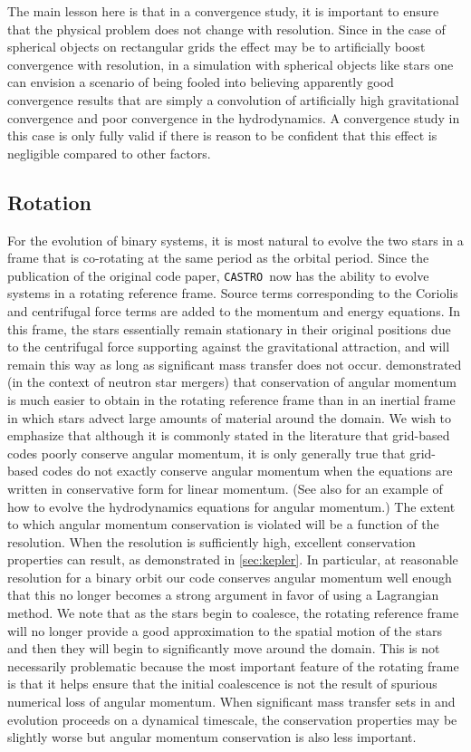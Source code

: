 \documentclass[iop]{../emulateapj}
\newcommand{\castro}{\texttt{CASTRO}}
\begin{document}
The main lesson here is that in a convergence study, it is important
to ensure that the physical problem does not change with
resolution. Since in the case of spherical objects on rectangular
grids the effect may be to artificially boost convergence with resolution,
in a simulation with spherical objects like stars one can envision a
scenario of being fooled into believing apparently good convergence
results that are simply a convolution of artificially high
gravitational convergence and poor convergence in the hydrodynamics. A
convergence study in this case is only fully valid if there is reason
to be confident that this effect is negligible compared to other
factors.

\subsection{Rotation}\label{sec:rotation}

For the evolution of binary systems, it is most natural to evolve the
two stars in a frame that is co-rotating at the same period as the
orbital period. Since the publication of the original code paper, \castro\ 
now has the ability to evolve systems in a rotating reference frame. 
Source terms corresponding to the Coriolis and centrifugal 
force terms are added to the momentum and energy equations. In this frame, 
the stars essentially remain stationary in their original positions due to the
centrifugal force supporting against the gravitational attraction, and
will remain this way as long as significant mass transfer does not
occur. \cite{swc:2000} demonstrated (in the context of neutron star
mergers) that conservation of angular momentum is much easier to
obtain in the rotating reference frame than in an inertial frame in
which stars advect large amounts of material around the domain. We
wish to emphasize that although it is commonly stated in the
literature that grid-based codes poorly conserve angular momentum,
it is only generally true that grid-based codes do not exactly conserve 
angular momentum when the equations are written in conservative form
for linear momentum. (See also \cite{motl:2002} for an example of how 
to evolve the hydrodynamics equations for angular momentum.) 
The extent to which angular momentum conservation is violated
will be a function of the resolution. When the resolution is sufficiently high, 
excellent conservation properties can result, as demonstrated in \autoref{sec:kepler}. 
In particular, at reasonable resolution for a binary orbit our code 
conserves angular momentum well enough that this no longer becomes 
a strong argument in favor of using a Lagrangian method.
We note that as the stars begin to coalesce, the rotating reference frame
will no longer provide a good approximation to the spatial motion of
the stars and then they will begin to significantly move around the
domain. This is not necessarily problematic because the most important
feature of the rotating frame is that it helps ensure that the initial
coalescence is not the result of spurious numerical loss of angular
momentum. When significant mass transfer sets in and evolution
proceeds on a dynamical timescale, the conservation properties may be
slightly worse but angular momentum conservation is also less
important.
\end{document}
